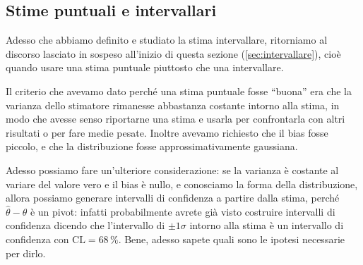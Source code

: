 \subsection{Stime puntuali e intervallari}

Adesso che abbiamo definito e studiato la stima intervallare, ritorniamo al
discorso lasciato in sospeso all'inizio di questa sezione
(\ref{sec:intervallare}), cioè quando usare una stima puntuale piuttosto che
una intervallare.

Il criterio che avevamo dato perché una stima puntuale fosse ``buona'' era che
la varianza dello stimatore rimanesse abbastanza costante intorno alla stima,
in modo che avesse senso riportarne una stima e usarla per confrontarla con
altri risultati o per fare medie pesate. Inoltre avevamo richiesto che il bias
fosse piccolo, e che la distribuzione fosse approssimativamente gaussiana.

Adesso possiamo fare un'ulteriore considerazione: se la varianza è costante al
variare del valore vero e il bias è nullo, e conosciamo la forma della
distribuzione, allora possiamo generare intervalli di confidenza a partire
dalla stima, perché $\hat\theta - \theta$ è un pivot: infatti probabilmente
avrete già visto costruire intervalli di confidenza dicendo che l'intervallo di
$\pm 1 \sigma$ intorno alla stima è un intervallo di confidenza con
$\mathrm{CL} = 68\,\%$. Bene, adesso sapete quali sono le ipotesi necessarie
per dirlo.
